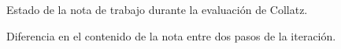 \begin{figure}[h]
    \centering
    \caption{Estado de la nota de trabajo durante la evaluación de Collatz.}
    \label{fig:collatz_code}
\end{figure}
\begin{figure}[h]
    \centering
    \caption{Diferencia en el contenido de la nota entre dos pasos de la iteración.}
    \label{fig:collatz_diff}
\end{figure}


